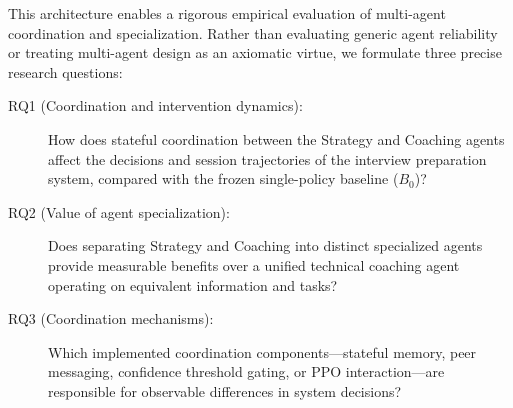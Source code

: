 This architecture enables a rigorous empirical evaluation of multi-agent coordination and specialization. Rather than evaluating generic agent reliability or treating multi-agent design as an axiomatic virtue, we formulate three precise research questions:
\begin{description}
\item[RQ1 (Coordination and intervention dynamics):] How does stateful coordination between the Strategy and Coaching agents affect the decisions and session trajectories of the interview preparation system, compared with the frozen single-policy baseline ($B_0$)?
\item[RQ2 (Value of agent specialization):] Does separating Strategy and Coaching into distinct specialized agents provide measurable benefits over a unified technical coaching agent operating on equivalent information and tasks?
\item[RQ3 (Coordination mechanisms):] Which implemented coordination components---stateful memory, peer messaging, confidence threshold gating, or PPO interaction---are responsible for observable differences in system decisions?
\end{description}

